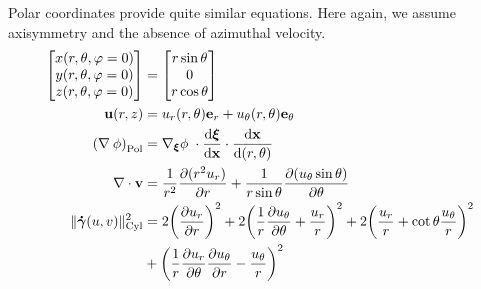 \documentclass[11 pt]{report}
\begin{document}
Polar coordinates provide quite similar equations. Here again, we assume axisymmetry and the absence of azimuthal velocity.
\begin{align}
    \begin{bmatrix}
        x(r, \theta, \varphi=0) \\
        y(r, \theta, \varphi=0) \\
        z(r, \theta, \varphi=0)
    \end{bmatrix} &=
    \begin{bmatrix}
        r \sin{\theta} \\
        0\\
        r \cos{\theta} \\
    \end{bmatrix}\\
    \mathbf{u}(r, z) &= u_r(r, \theta) \mathbf{e}_r + u_\theta(r, \theta) \mathbf{e}_\theta\\
    \left(\nabla \: \phi\right)_{\text{Pol}} &= \nabla_{\boldsymbol\xi} \phi \; \cdot \dv{\boldsymbol \xi}{\mathbf{x}} \cdot \dv{\mathbf{x}}{(r, \theta)} \\
    \nabla \cdot \mathbf{v} &= \frac{1}{r^2}\pdv{(r^2 u_r)}{r} + \frac{1}{r\sin\theta} \pdv{(u_\theta \sin \theta)}{\theta}\\
    \|\boldsymbol{\dot \gamma}(u, v)\|_{\text{Cyl}}^2 &= 2 \bigg(\pdv{u_r}{r}\bigg)^2 + 2\bigg(\frac{1}{r}\pdv{u_\theta}{\theta} + \frac{u_r}{r}\bigg)^2 + 2\bigg(\frac{u_r}{r} + \cot \theta \frac{u_\theta}{r}\bigg)^2 \nonumber\\
    &+ \bigg(\frac{1}{r}\pdv{u_r}{\theta} \pdv{u_\theta}{r} - \frac{u_\theta}{r}\bigg)^2
\end{align}
\end{document}
